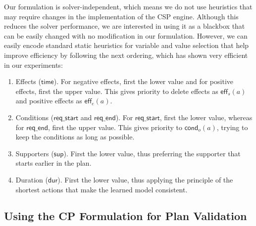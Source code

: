 \documentclass[runningheads]{llncs}
\newcommand{\eff}{\mathsf{eff}}    %
\newcommand{\cond}{\mathsf{cond}}  %
\newcommand{\dur}{\mathsf{dur}}    %
\newcommand{\supp}{\mathsf{sup}}   %
\newcommand{\tim}{\mathsf{time}}   %
\newcommand{\reqs}{\mathsf{req\_{start}}} %
\newcommand{\reqe}{\mathsf{req\_{end}}}   %
\begin{document}
Our formulation is solver-independent, which means we do not use heuristics that may require changes in the implementation of the CSP engine.
Although this reduces the solver performance, we are interested in using it as a blackbox that can be easily changed with no modification in our formulation. However, we can easily encode standard static heuristics for variable and value selection that help improve efficiency by following the next ordering, which has shown very efficient in our experiments:



\begin{enumerate}
  \item Effects ($\tim$). For negative effects, first the lower value and for positive effects, first the upper value. This gives priority to delete effects as $\eff_s(a)$ and positive effects as $\eff_e(a)$.
  \item Conditions ($\reqs$ and $\reqe$). For $\reqs$, first the lower value, whereas for $\reqe$, first the upper value. This gives priority to $\cond_o(a)$, trying to keep the conditions as long as possible.
  \item Supporters ($\supp$). First the lower value, thus preferring the supporter that starts earlier in the plan.
  \item Duration ($\dur$). First the lower value, thus applying the principle of the shortest actions that make the learned model consistent.
\end{enumerate}




\subsection{Using the CP Formulation for Plan Validation}
\label{sec:usingCPValidation}
\end{document}

